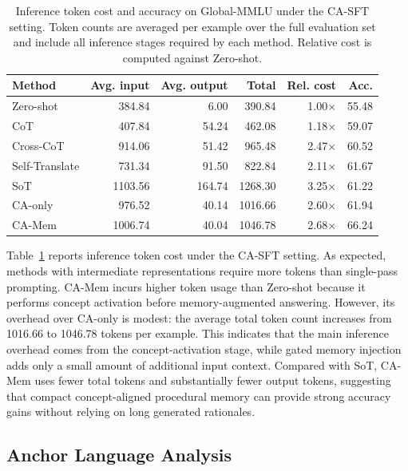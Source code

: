 \documentclass[11pt]{article}
\begin{document}
\begin{table}[t]
\centering
\footnotesize
\setlength{\tabcolsep}{2pt}
\begin{tabular}{lrrrrr}
\hline
Method & Avg. input & Avg. output & Total & Rel. cost & Acc. \\
\hline
Zero-shot       & 384.84  & 6.00   & 390.84  & 1.00$\times$ & 55.48 \\
CoT             & 407.84  & 54.24  & 462.08  & 1.18$\times$ & 59.07 \\
Cross-CoT       & 914.06  & 51.42  & 965.48  & 2.47$\times$ & 60.52 \\
Self-Translate  & 731.34  & 91.50  & 822.84  & 2.11$\times$ & 61.67 \\
SoT             & 1103.56 & 164.74 & 1268.30 & 3.25$\times$ & 61.22 \\
CA-only         & 976.52  & 40.14  & 1016.66 & 2.60$\times$ & 61.94 \\
CA-Mem          & 1006.74 & 40.04  & 1046.78 & 2.68$\times$ & 66.24 \\
\hline
\end{tabular}%
\caption{Inference token cost and accuracy on Global-MMLU under the CA-SFT setting. Token counts are averaged per example over the full evaluation set and include all inference stages required by each method. Relative cost is computed against Zero-shot.}
\label{tab:inference_cost}
\end{table}

Table~\ref{tab:inference_cost} reports inference token cost under the CA-SFT setting. As expected, methods with intermediate representations require more tokens than single-pass prompting. CA-Mem incurs higher token usage than Zero-shot because it performs concept activation before memory-augmented answering. However, its overhead over CA-only is modest: the average total token count increases from 1016.66 to 1046.78 tokens per example. This indicates that the main inference overhead comes from the concept-activation stage, while gated memory injection adds only a small amount of additional input context. Compared with SoT, CA-Mem uses fewer total tokens and substantially fewer output tokens, suggesting that compact concept-aligned procedural memory can provide strong accuracy gains without relying on long generated rationales.

\subsection{Anchor Language Analysis}
\label{sec:app_anchor_language}
\end{document}
